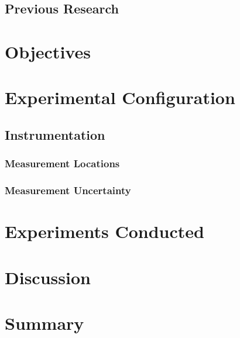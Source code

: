 \documentclass[12pt,oneside]{book}
\begin{document}
\section{Previous Research}


\chapter{Objectives}


\chapter{Experimental Configuration}
\label{chap:exp_config}

\section{Instrumentation}
\label{sec:instrument}

\subsection{Measurement Locations}
\label{subsec:measure_locs}

\subsection{Measurement Uncertainty}
\label{subsec:measure_locs}


\chapter{Experiments Conducted}




\chapter{Discussion}


\chapter{Summary}




\clearpage

\appendix
\end{document}
